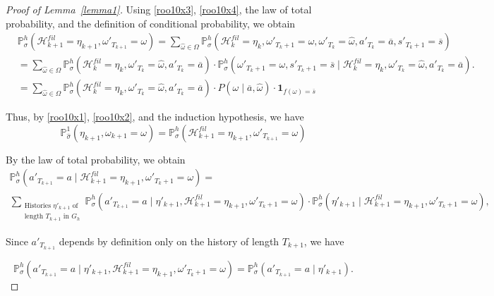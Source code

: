 \documentclass[english,openary,11pt]{article}
\theoremstyle{definition}
\renewcommand{\P}{\mathbb{P}}
\begin{document}
\begin{proof}[Proof of Lemma~\ref{lemma1}]
Using \eqref{roo10x3}, \eqref{roo10x4}, the law of total probability, and the definition of conditional probability, we obtain
\begin{equation}
\begin{aligned}
&\P_{\sigma}^h(\mathcal H^{fil}_{k+1} = \eta_{k+1}, \omega'_{T_{k+1}} = \omega) = \sum_{\widehat \omega \in \Omega}
\P_{\sigma}^h(\mathcal H^{fil}_{k} = \eta_{k}, \omega'_{T_{k}+1} = \omega, \omega'_{T_{k}} = \widehat \omega, a'_{T_{k}} = \overline a, s'_{T_{k}+1} = \overline s) \\
&=
\sum_{\widehat \omega \in \Omega}
\P_{\sigma}^h(\mathcal H^{fil}_{k} = \eta_{k}, \omega'_{T_{k}} = \widehat \omega, a'_{T_{k}} = \overline a) \cdot 
\P_{\sigma}^h(\omega'_{T_{k}+1} = \omega, s'_{T_{k}+1} = \overline s \mid \mathcal H^{fil}_{k} = \eta_{k}, \omega'_{T_{k}} = \widehat \omega, a'_{T_{k}} = \overline a). \\
&=
\sum_{\widehat \omega \in \Omega}
\P_{\sigma}^h(\mathcal H^{fil}_{k} = \eta_{k}, \omega'_{T_{k}} = \widehat \omega, a'_{T_{k}} = \overline a) \cdot P(\omega \mid \overline a, \widehat \omega) \cdot \mathbf{1}_{f(\omega) = \overline s}
\end{aligned}
\label{roo10x2}
\end{equation}


Thus, by \eqref{roo10x1}, \eqref{roo10x2}, and the induction hypothesis, we have
\begin{equation}
\mathbb{P}_{\widehat{\sigma}}^1(\eta_{k+1}, \omega_{k+1} = \omega) = \P_{\sigma}^h(\mathcal H^{fil}_{k+1} = \eta_{k+1}, \omega'_{T_{k+1}} = \omega)
\label{roo08}
\end{equation}

By the law of total probability, we obtain
\begin{multline}
\P_{\sigma}^h(a'_{T_{k+1}} = a \mid \mathcal H^{fil}_{k+1} = \eta_{k+1}, \omega'_{T_{k}+1} = \omega) = \\ 
\sum_{\substack{\text{Histories } \eta'_{k+1} \text{ of} \\ \text{length } T_{k+1} \text{ in } G_h}}
\P_{\sigma}^h(a'_{T_{k+1}} = a \mid \eta'_{k+1}, \mathcal H^{fil}_{k+1} = \eta_{k+1}, \omega'_{T_{k}+1} = \omega) \cdot \P_{\sigma}^h(\eta'_{k+1} \mid \mathcal H^{fil}_{k+1} = \eta_{k+1}, \omega'_{T_{k}+1} = \omega),
\label{roo04}
\end{multline}

Since $a'_{T_{k+1}}$ depends by definition only on the history of length $T_{k+1}$, we have

\begin{equation}
\P_{\sigma}^h(a'_{T_{k+1}} = a \mid \eta'_{k+1}, \mathcal H^{fil}_{k+1} = \eta_{k+1}, \omega'_{T_{k}+1} = \omega) = \P_{\sigma}^h(a'_{T_{k+1}} = a \mid \eta'_{k+1}).
\label{roo03}
\end{equation}


\end{proof}
\end{document}
